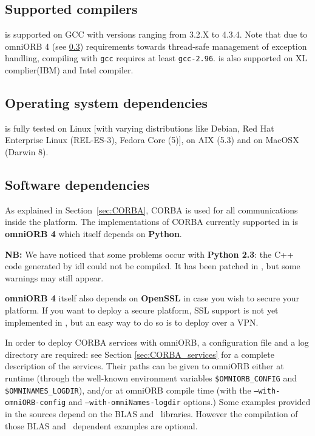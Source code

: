 \subsection{Supported compilers}
\diet is supported on GCC with versions ranging from 3.2.X to 4.3.4.
Note that due to omniORB 4 (see \ref{sec:software_dependencies})
requirements towards thread-safe management of exception handling,
compiling \diet with \verb+gcc+ requires at least \verb+gcc-2.96+.
\diet is also supported on XL complier(IBM) and Intel compiler.

\subsection{Operating system dependencies}
\diet is fully tested on Linux [with varying distributions like
  Debian, Red Hat Enterprise Linux (REL-ES-3), Fedora Core (5)], on
AIX (5.3) and on MacOSX (Darwin 8).

\subsection{Software dependencies}
\label{sec:software_dependencies}

As explained in Section~\ref{sec:CORBA}, CORBA is used for all
communications inside the platform.  The implementations of CORBA
currently supported in \diet is \textbf{omniORB 4} which itself
depends on \textbf{Python}.

\noindent 
\textbf{NB:} We have noticed that some problems occur with
\textbf{Python 2.3}: the C++ code generated by idl could not be
compiled. It has been patched in \diet, but some warnings may still
appear.

\textbf{omniORB 4} itself also depends on \textbf{OpenSSL} in case you
wish to secure your \diet platform. If you want to deploy a secure
\diet platform, SSL support is not yet implemented  in \diet, but an
easy way to do so is to deploy \diet over a VPN.

In order to deploy CORBA services with omniORB, a configuration file
and a log directory are required: see Section \ref{sec:CORBA_services}
for a complete description of the services.  Their paths can be given
to omniORB either at runtime (through the well-known environment
variables \texttt{\$OMNIORB\_CONFIG} and
\texttt{\$OMNINAMES\_LOGDIR}), and/or at omniORB compile time (with
the \linebreak\texttt{--with-omniORB-config} and
\texttt{--with-omniNames-logdir} options.)  Some examples provided in
the \diet sources depend on the BLAS and
\scalapack\ libraries. However the compilation of those BLAS and
\scalapack\ dependent examples are optional.

